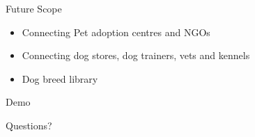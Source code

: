 \documentclass[14pt]{beamer}
\begin{document}
\begin{frame}{Future Scope}
    \begin{itemize}
        \item Connecting Pet adoption centres and NGOs
        \item Connecting dog stores, dog trainers, vets and kennels 
        \item Dog breed library
    \end{itemize}
\end{frame}

\begin{frame}[Standout]
    Demo
\end{frame}

\begin{frame}[Standout]
    Questions?
\end{frame}
\end{document}
